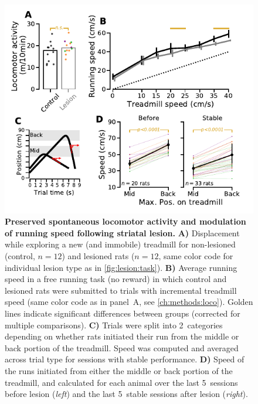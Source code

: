 \begin{figure}[bt!]
	\begin{center}
		\includegraphics[scale=1]{ch-lesion/figures/MotorPreserved.pdf}
		\caption[Preserved Motor Control After Striatal Lesion]
		{\textbf{Preserved spontaneous locomotor activity and modulation of running speed following striatal lesion.}
		\textbf{A)}
		Displacement while exploring a new (and immobile) treadmill for non-lesioned (control, $n=12$) and lesioned rats ($n=12$, same color code for individual lesion type as in \autoref{fig:lesion:task}).
		\textbf{B)}
		Average running speed in a free running task (no reward) in which control and lesioned rats were submitted to trials with incremental treadmill speed (same color code as in panel~A, see \autoref{ch:methods:loco}).
		Golden lines indicate significant differences between groups (corrected for multiple comparisons).
		\textbf{C)}
		Trials were split into 2~categories depending on whether rats initiated their run from the middle or back portion of the treadmill.
		Speed was computed and averaged across trial type for sessions with stable performance.
		\textbf{D)}
		Speed of the runs initiated from either the middle or back portion of the treadmill, and calculated for each animal over the last 5~sessions before lesion (\textit{left}) and the last 5~stable sessions after lesion (\textit{right}).
		}
		\label{fig:lesion:motorOk}
	\end{center}
\end{figure}